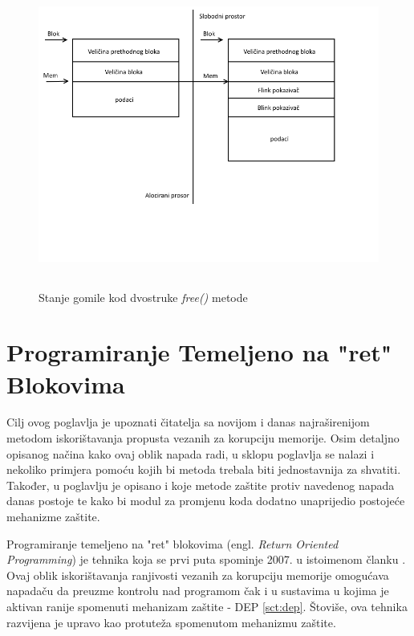 \documentclass[times, utf8, diplomski, numeric]{fer}
\begin{document}
\begin{figure}[!ht]
\centering
\setlength\fboxsep{0pt}
\setlength\fboxrule{0.5pt}
\includegraphics[width=15cm, height=10cm]{slike/double_free}
\caption{Stanje gomile kod dvostruke \emph{free()} metode}
\label{fig:double_free} 
\end{figure}
\pagebreak
 

\section{Programiranje Temeljeno na "ret" Blokovima}
\label{sct:rop}
Cilj ovog poglavlja je upoznati čitatelja sa novijom i danas najraširenijom metodom iskorištavanja propusta vezanih za korupciju memorije. Osim detaljno opisanog načina kako ovaj oblik napada radi, u sklopu poglavlja se nalazi i nekoliko primjera pomoću kojih bi metoda trebala biti jednostavnija za shvatiti. Također, u poglavlju je opisano i koje metode zaštite protiv navedenog napada danas postoje te kako bi modul za promjenu koda dodatno unaprijedio postojeće mehanizme zaštite.

Programiranje temeljeno na "ret" blokovima (engl. \emph{Return Oriented Programming}) je tehnika koja se prvi puta spominje 2007. u istoimenom članku \citep{rop_official}. Ovaj oblik iskorištavanja ranjivosti vezanih za korupciju memorije omogućava napadaču da preuzme kontrolu nad programom čak i u sustavima u kojima je aktivan ranije spomenuti mehanizam zaštite - DEP \ref{sct:dep}. Štoviše, ova tehnika razvijena je upravo kao protuteža spomenutom mehanizmu zaštite.
\end{document}
